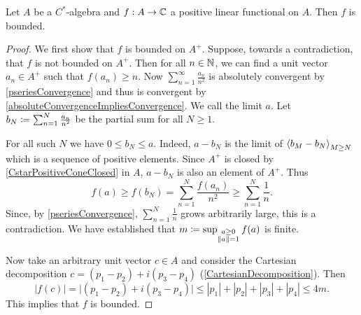 \begin{proposition} \label{positiveLinearFunctionalBounded}
Let $A$ be a $C^*$-algebra and $f: A\to \mathbb{C}$ a positive linear functional on $A$. Then $f$ is bounded.
\end{proposition}
\begin{proof}
We first show that $f$ is bounded on $A^+$. Suppose, towards a contradiction, that $f$ is not bounded on $A^+$. Then for all $n\in \mathbb{N}$, we can find a unit vector $a_n\in A^+$ such that $f(a_n) \geq n$. Now $\sum_{n=1}^\infty \frac{a_n}{n^2}$ is absolutely convergent by \ref{pseriesConvergence} and thus is convergent by \ref{absoluteConvergenceImpliesConvergence}. We call the limit $a$. Let $b_N \coloneqq \sum_{n=1}^N \frac{a_n}{n^2}$ be the partial sum for all $N\geq 1$.

For all such $N$ we have $0 \leq b_N \leq a$. Indeed, $a-b_N$ is the limit of $\left\langle b_M - b_N \right\rangle_{M\geq N}$ which is a sequence of positive elements. Since $A^+$ is closed by \ref{CstarPositiveConeClosed} in $A$, $a-b_N$ is also an element of $A^+$. Thus
\[ f(a) \geq f(b_N) = \sum_{n=1}^N \frac{f(a_n)}{n^2} \geq \sum_{n=1}^N \frac{1}{n}. \]
Since, by \ref{pseriesConvergence}, $\sum_{n=1}^N \frac{1}{n}$ grows arbitrarily large, this is a contradiction. We have established that $m \coloneqq\sup_{\substack{a \geq 0  \\ \lVert a\rVert = 1}} f(a)$ is finite.

Now take an arbitrary unit vector $c\in A$ and consider the Cartesian decomposition $c = (p_1 - p_2) + i(p_3 - p_4)$ (\ref{CartesianDecomposition}). Then
\[ |f(c)| = \big|(p_1 - p_2) + i(p_3 - p_4)\big| \leq |p_1| + |p_2| + |p_3| + |p_4| \leq 4m. \]
This implies that $f$ is bounded.
\end{proof}

